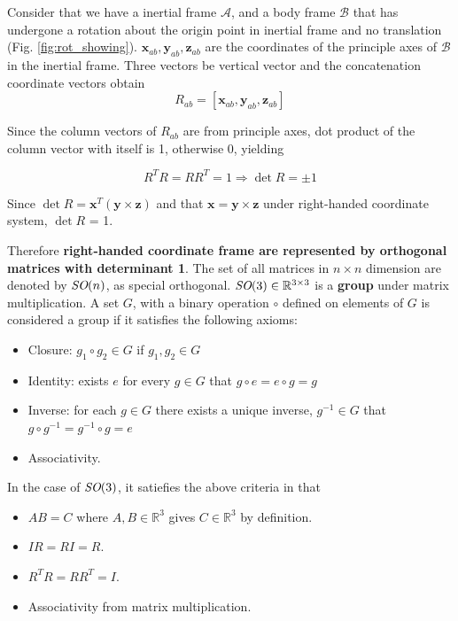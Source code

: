 \documentclass[letterpaper]{article}
\begin{document}
Consider that we have a inertial frame $\mathcal{A}$, and a body frame $\mathcal{B}$ that has undergone a rotation
about the origin point in inertial frame and no translation (Fig. \ref{fig:rot_showing}).
$\mathbf{x}_{ab}, \mathbf{y}_{ab}, \mathbf{z}_{ab}$ are
the coordinates of the principle axes of $\mathcal{B}$ in the inertial frame. Three vectors be vertical vector
and the concatenation coordinate vectors obtain
$$R_{ab} = [\mathbf{x}_{ab}, \mathbf{y}_{ab}, \mathbf{z}_{ab}]$$

Since the column vectors of $R_{ab}$ are from principle axes, dot product of the column vector with
itself is 1, otherwise 0, yielding

$$R^TR = RR^T = 1 \Rightarrow \det R = \pm 1$$

Since $\det R = \mathbf{x}^T(\mathbf{y} \times \mathbf{z})$ and that $\mathbf{x} = \mathbf{y} \times \mathbf{z}$ under
right-handed coordinate system, $\det R$ = 1. 

Therefore \textbf{right-handed coordinate frame are represented by orthogonal matrices with determinant 1}. 
The set of all matrices in $n \times n$ dimension are denoted by $\emph{SO}(n)$, as special orthogonal.
$\emph{SO}(3) \in \mathbb{R}^{3\times 3}$ is a \textbf{group} under matrix multiplication. A set $G$, with a binary
operation $\circ$ defined on elements of $G$ is considered a group if it satisfies the following axioms:
\begin{itemize}
  \setlength\itemsep{0pt}
  \item Closure: $g_1 \circ g_2 \in G$ if $g_1, g_2 \in G$
  \item Identity: exists $e$ for every $g \in G$ that $g\circ e = e\circ g = g$
  \item Inverse: for each $g \in G$ there exists a unique inverse, $g^{-1} \in G$ that $g \circ g^{-1} = g^{-1} \circ g = e$
  \item Associativity. 
\end{itemize}

In the case of $\emph{SO}(3)$, it satiefies the above criteria in that
\begin{itemize}
  \setlength\itemsep{0pt}
  \item $AB=C$ where $A, B \in \mathbb{R}^3$ gives $C\in \mathbb{R}^3$ by definition.
  \item $IR = RI = R$.
  \item $R^TR = RR^T = I$.
  \item Associativity from matrix multiplication.
\end{itemize}
\end{document}
